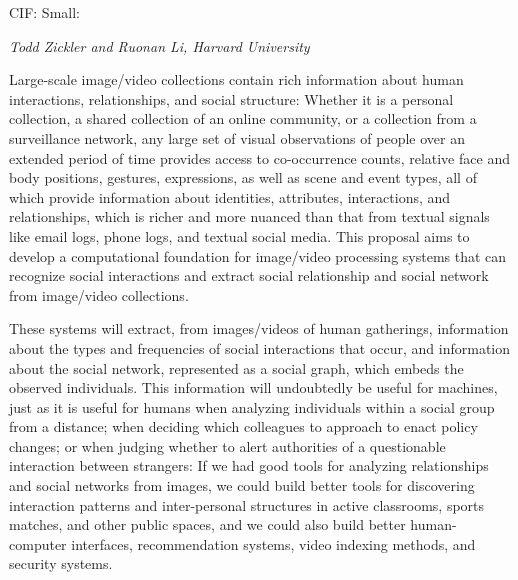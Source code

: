 \pagestyle{empty}

\noindent\textsf{CIF: Small:}\vspace{0.9ex}\\

\vspace{1.0ex}
\noindent \textsf{\large \em Todd Zickler and Ruonan Li, Harvard University}
\vspace{2.0ex}



\noindent Large-scale image/video collections contain rich information about human interactions, relationships, and social structure: Whether it is a personal collection, a shared collection of an online community, or a collection from a surveillance network, any large set of visual observations of people over an extended period of time provides access to co-occurrence counts, relative face and body positions, gestures, expressions, as well as scene and event types, all of which provide information about identities, attributes, interactions, and relationships, which is richer and more nuanced than that from textual signals like email logs, phone logs, and textual social media. This proposal aims to develop a computational foundation for image/video processing systems that can recognize social interactions and extract social relationship and social network from image/video collections. 

These systems will extract, from images/videos of human gatherings, information about the types and frequencies of social interactions that occur, and information about the social network, represented as a social graph, which embeds the observed individuals. This information will undoubtedly be useful for machines, just as it is useful for humans when analyzing individuals within a social group from a distance; when deciding which colleagues to approach to enact policy changes; or when judging whether to alert authorities of a questionable interaction between strangers: If we had good tools for analyzing relationships and social networks from images, we could build better tools for discovering interaction patterns and inter-personal structures in active classrooms, sports matches, and other public spaces, and we could also build better human-computer interfaces, recommendation systems, video indexing methods, and security systems.

